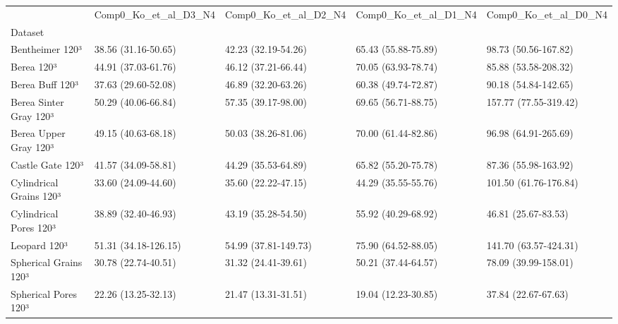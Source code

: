 \begin{tabular}{lllll}
\toprule
 & Comp0_Ko_et_al_D3_N4 & Comp0_Ko_et_al_D2_N4 & Comp0_Ko_et_al_D1_N4 & Comp0_Ko_et_al_D0_N4 \\
Dataset &  &  &  &  \\
\midrule
Bentheimer 120³ & 38.56 (31.16-50.65) & 42.23 (32.19-54.26) & 65.43 (55.88-75.89) & 98.73 (50.56-167.82) \\
Berea 120³ & 44.91 (37.03-61.76) & 46.12 (37.21-66.44) & 70.05 (63.93-78.74) & 85.88 (53.58-208.32) \\
Berea Buff 120³ & 37.63 (29.60-52.08) & 46.89 (32.20-63.26) & 60.38 (49.74-72.87) & 90.18 (54.84-142.65) \\
Berea Sinter Gray 120³ & 50.29 (40.06-66.84) & 57.35 (39.17-98.00) & 69.65 (56.71-88.75) & 157.77 (77.55-319.42) \\
Berea Upper Gray 120³ & 49.15 (40.63-68.18) & 50.03 (38.26-81.06) & 70.00 (61.44-82.86) & 96.98 (64.91-265.69) \\
Castle Gate 120³ & 41.57 (34.09-58.81) & 44.29 (35.53-64.89) & 65.82 (55.20-75.78) & 87.36 (55.98-163.92) \\
Cylindrical Grains 120³ & 33.60 (24.09-44.60) & 35.60 (22.22-47.15) & 44.29 (35.55-55.76) & 101.50 (61.76-176.84) \\
Cylindrical Pores 120³ & 38.89 (32.40-46.93) & 43.19 (35.28-54.50) & 55.92 (40.29-68.92) & 46.81 (25.67-83.53) \\
Leopard 120³ & 51.31 (34.18-126.15) & 54.99 (37.81-149.73) & 75.90 (64.52-88.05) & 141.70 (63.57-424.31) \\
Spherical Grains 120³ & 30.78 (22.74-40.51) & 31.32 (24.41-39.61) & 50.21 (37.44-64.57) & 78.09 (39.99-158.01) \\
Spherical Pores 120³ & 22.26 (13.25-32.13) & 21.47 (13.31-31.51) & 19.04 (12.23-30.85) & 37.84 (22.67-67.63) \\
\bottomrule
\end{tabular}
